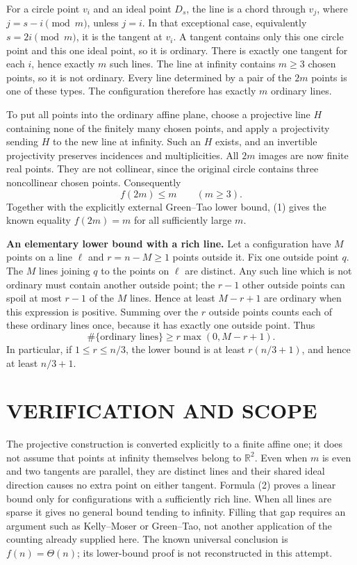 For a circle point $v_i$ and an ideal point $D_s$, the line is a chord through $v_j$, where $j=s-i\pmod m$, unless $j=i$. In that exceptional case, equivalently $s=2i\pmod m$, it is the tangent at $v_i$. A tangent contains only this one circle point and this one ideal point, so it is ordinary. There is exactly one tangent for each $i$, hence exactly $m$ such lines. The line at infinity contains $m\geq3$ chosen points, so it is not ordinary. Every line determined by a pair of the $2m$ points is one of these types. The configuration therefore has exactly $m$ ordinary lines.

To put all points into the ordinary affine plane, choose a projective line $H$ containing none of the finitely many chosen points, and apply a projectivity sending $H$ to the new line at infinity. Such an $H$ exists, and an invertible projectivity preserves incidences and multiplicities. All $2m$ images are now finite real points. They are not collinear, since the original circle contains three noncollinear chosen points. Consequently
\[
f(2m)\leq m\qquad(m\geq3).
\tag{1}
\]
Together with the explicitly external Green--Tao lower bound, (1) gives the known equality $f(2m)=m$ for all sufficiently large $m$.

\textbf{An elementary lower bound with a rich line.} Let a configuration have $M$ points on a line $\ell$ and $r=n-M\geq1$ points outside it. Fix one outside point $q$. The $M$ lines joining $q$ to the points on $\ell$ are distinct. Any such line which is not ordinary must contain another outside point; the $r-1$ other outside points can spoil at most $r-1$ of the $M$ lines. Hence at least $M-r+1$ are ordinary when this expression is positive. Summing over the $r$ outside points counts each of these ordinary lines once, because it has exactly one outside point. Thus
\[
\#\{\text{ordinary lines}\}\geq r\max(0,M-r+1).
\tag{2}
\]
In particular, if $1\leq r\leq n/3$, the lower bound is at least $r(n/3+1)$, and hence at least $n/3+1$.

\section{VERIFICATION AND SCOPE}
The projective construction is converted explicitly to a finite affine one; it does not assume that points at infinity themselves belong to $\mathbb R^2$. Even when $m$ is even and two tangents are parallel, they are distinct lines and their shared ideal direction causes no extra point on either tangent. Formula (2) proves a linear bound only for configurations with a sufficiently rich line. When all lines are sparse it gives no general bound tending to infinity. Filling that gap requires an argument such as Kelly--Moser or Green--Tao, not another application of the counting already supplied here. The known universal conclusion is $f(n)=\Theta(n)$; its lower-bound proof is not reconstructed in this attempt.

